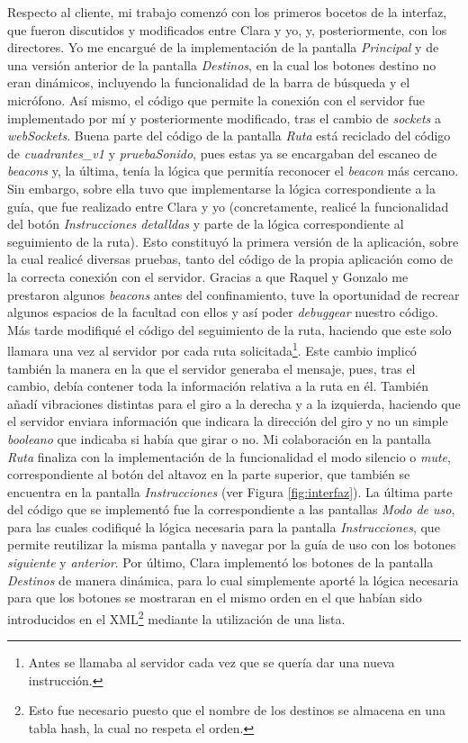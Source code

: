 Respecto al cliente, mi trabajo comenzó con los primeros bocetos de la interfaz, que fueron discutidos y modificados entre Clara y yo, y, posteriormente, con los directores. Yo me encargué de la implementación de la pantalla \textit{Principal} y de una versión anterior de la pantalla \textit{Destinos}, en la cual los botones destino no eran dinámicos, incluyendo la funcionalidad de la barra de búsqueda y el micrófono. Así mismo, el código que permite la conexión con el servidor fue implementado por mí y posteriormente modificado, tras el cambio de \textit{sockets} a \textit{webSockets}. Buena parte del código de la pantalla \textit{Ruta} está reciclado del código de \textit{cuadrantes\_v1} y \textit{pruebaSonido}, pues estas ya se encargaban del escaneo de \textit{beacons} y, la última, tenía la lógica que permitía reconocer el \textit{beacon} más cercano. Sin embargo, sobre ella tuvo que implementarse la lógica correspondiente a la guía, que fue realizado entre Clara y yo (concretamente, realicé la funcionalidad del botón \textit{Instrucciones detalldas} y parte de la lógica correspondiente al seguimiento de la ruta). Esto constituyó la primera versión de la aplicación, sobre la cual realicé diversas pruebas, tanto del código de la propia aplicación como de la correcta conexión con el servidor. Gracias a que Raquel y Gonzalo me prestaron algunos \textit{beacons} antes del confinamiento, tuve la oportunidad de recrear algunos espacios de la facultad con ellos y así poder \textit{debuggear} nuestro código. Más tarde modifiqué el código del seguimiento de la ruta, haciendo que este solo llamara una vez al servidor por cada ruta solicitada\footnote{Antes se llamaba al servidor cada vez que se quería dar una nueva instrucción.}. Este cambio implicó también la manera en la que el servidor generaba el mensaje, pues, tras el cambio, debía contener toda la información relativa a la ruta en él. También añadí vibraciones distintas para el giro a la derecha y a la izquierda, haciendo que el servidor enviara información que indicara la dirección del giro y no un simple \textit{booleano} que indicaba si había que girar o no. Mi colaboración en la pantalla \textit{Ruta} finaliza con la implementación de la funcionalidad el modo silencio o \textit{mute}, correspondiente al botón del altavoz en la parte superior, que también se encuentra en la pantalla \textit{Instrucciones} (ver Figura \ref{fig:interfaz}). La última parte del código que se implementó fue la correspondiente a las pantallas \textit{Modo de uso}, para las cuales codifiqué la lógica necesaria para la pantalla \textit{Instrucciones}, que permite reutilizar la misma pantalla y navegar por la guía de uso con los botones \textit{siguiente} y \textit{anterior}. Por último, Clara implementó los botones de la pantalla \textit{Destinos} de manera dinámica, para lo cual simplemente aporté la lógica necesaria para que los botones se mostraran en el mismo orden en el que habían sido introducidos en el XML\footnote{Esto fue necesario puesto que el nombre de los destinos se almacena en una tabla hash, la cual no respeta el orden.} mediante la utilización de una lista.

